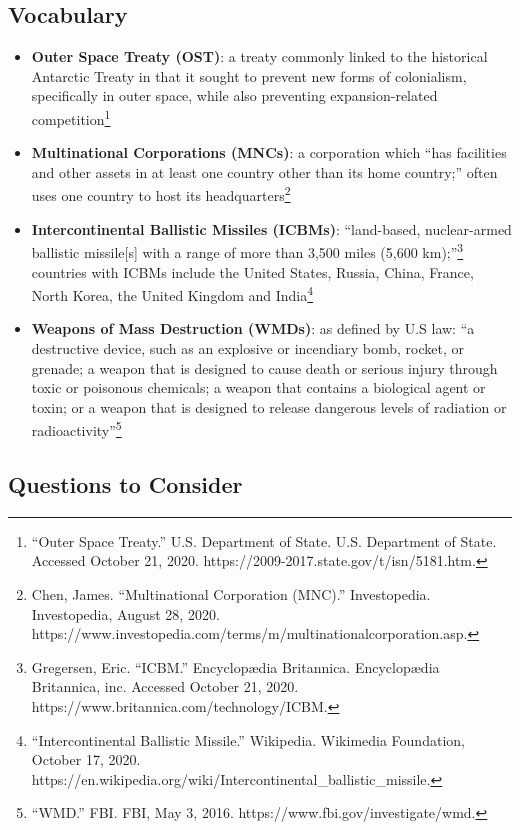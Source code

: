\documentclass[10pt, letterpaper]{article}
\begin{document}
\subsection{Vocabulary}

\begin{itemize}
\item 
\textbf{Outer Space Treaty (OST)}: a treaty commonly linked to the
historical Antarctic Treaty in that it sought to prevent new forms of
colonialism, specifically in outer space, while also preventing
expansion-related competition\footnote{``Outer Space Treaty.'' U.S.
  Department of State. U.S. Department of State. Accessed October 21,
  2020. https://2009-2017.state.gov/t/isn/5181.htm.}

\item 
\textbf{Multinational Corporations (MNCs)}: a corporation which ``has
facilities and other assets in at least one country other than its home
country;'' often uses one country to host its headquarters\footnote{Chen,
  James. ``Multinational Corporation (MNC).'' Investopedia.
  Investopedia, August 28, 2020.
  https://www.investopedia.com/terms/m/multinationalcorporation.asp.}

\item 
\textbf{Intercontinental Ballistic Missiles (ICBMs)}: ``land-based,
nuclear-armed ballistic missile{[}s{]} with a range of more than 3,500
miles (5,600 km);''\footnote{Gregersen, Eric. ``ICBM.'' Encyclopædia
  Britannica. Encyclopædia Britannica, inc. Accessed October 21, 2020.
  https://www.britannica.com/technology/ICBM.} countries with ICBMs
include the United States, Russia, China, France, North Korea, the
United Kingdom and India\footnote{``Intercontinental Ballistic
  Missile.'' Wikipedia. Wikimedia Foundation, October 17, 2020.
  https://en.wikipedia.org/wiki/Intercontinental\_ballistic\_missile.}

\item 
\textbf{Weapons of Mass Destruction (WMDs)}: as defined by U.S law: ``a
destructive device, such as an explosive or incendiary bomb, rocket, or
grenade; a weapon that is designed to cause death or serious injury
through toxic or poisonous chemicals; a weapon that contains a
biological agent or toxin; or a weapon that is designed to release
dangerous levels of radiation or radioactivity''\footnote{``WMD.'' FBI.
  FBI, May 3, 2016. https://www.fbi.gov/investigate/wmd.}
\end{itemize}

\subsection{Questions to Consider}
\end{document}
